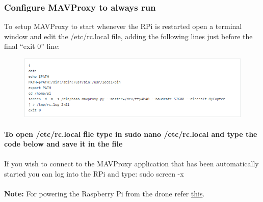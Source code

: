 \documentclass[a4paper,12pt,oneside]{book}
\begin{document}
			\subsubsection{Configure MAVProxy to always run}
				To setup MAVProxy to start whenever the RPi is restarted open a terminal window and edit the /etc/rc.local file, adding the following lines just before the final “exit 0” line: 
				\begin{figure}[H]
	 	\centering
		\includegraphics[scale=0.75]{command}
		
\end{figure}
\paragraph{To open /etc/rc.local file type in sudo nano /etc/rc.local and type the code below and save it in the file}
\paragraph{}If you wish to connect to the MAVProxy application that has been automatically started you can log into the RPi and type: sudo screen -x

\paragraph{}\textbf{Note:} For powering the Raspberry Pi from the drone refer \href{https://github.com/eYSIP-2016/Autonomous-Drone/blob/master/Tutorials/Power%20Management%20System/Powering_the_Set-Up.pdf}{this}.
\end{document}
